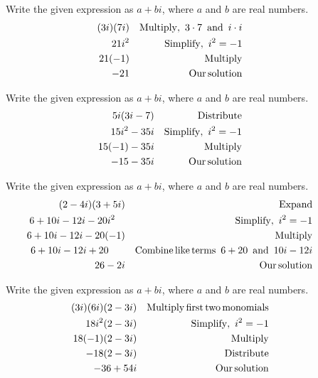 \begin{example}~~~Write the given expression as $a+bi$, where $a$ and $b$ are real numbers.
  \begin{eqnarray*}
    (3 i) (7 i) &  & \operatorname{Multiply,~} 3\cdot 7 \operatorname{~and~} i\cdot i\\
    21 i^2 &  & \operatorname{Simplify,~} i^2 = - 1\\
    21 (- 1) &  & \operatorname{Multiply}\\
    - 21 &  & \operatorname{Our} \operatorname{solution}
  \end{eqnarray*}
\end{example}

\begin{example}~~~Write the given expression as $a+bi$, where $a$ and $b$ are real numbers.
  \begin{eqnarray*}
    5 i (3 i - 7) &  & \operatorname{Distribute}\\
    15 i^2 - 35 i &  & \operatorname{Simplify,~} i^2 = - 1\\
    15 (- 1) - 35 i &  & \operatorname{Multiply}\\
    - 15 - 35 i &  & \operatorname{Our} \operatorname{solution}
  \end{eqnarray*}
\end{example}

\begin{example}~~~Write the given expression as $a+bi$, where $a$ and $b$ are real numbers.
  \begin{eqnarray*}
    (2 - 4 i) (3 + 5 i) &  & \operatorname{Expand}\\
    6 + 10 i - 12 i - 20 i^2~~~ &  & \operatorname{Simplify,~} i^2 = - 1\\
    6 + 10 i - 12 i - 20 (- 1) &  & \operatorname{Multiply}\\
    6 + 10 i - 12 i + 20~~~~~ &  & \operatorname{Combine} \operatorname{like} \operatorname{terms~} 6 + 20
    \operatorname{~and~} 10 i - 12 i\\
    26 - 2 i &  & \operatorname{Our} \operatorname{solution}
  \end{eqnarray*}
\end{example}

\begin{example}~~~Write the given expression as $a+bi$, where $a$ and $b$ are real numbers.
  \begin{eqnarray*}
    (3 i) (6 i) (2 - 3 i) &  & \operatorname{Multiply} \operatorname{first} \operatorname{two}
    \operatorname{monomials}\\
		18i^2(2-3i) & & \operatorname{Simplify,~} i^2=-1\\
		18(-1)(2-3i) & & \operatorname{Multiply}\\
		-18(2-3i) & & \operatorname{Distribute}\\
    -36 + 54 i &  & \operatorname{Our} \operatorname{solution}
  \end{eqnarray*}
\end{example}


